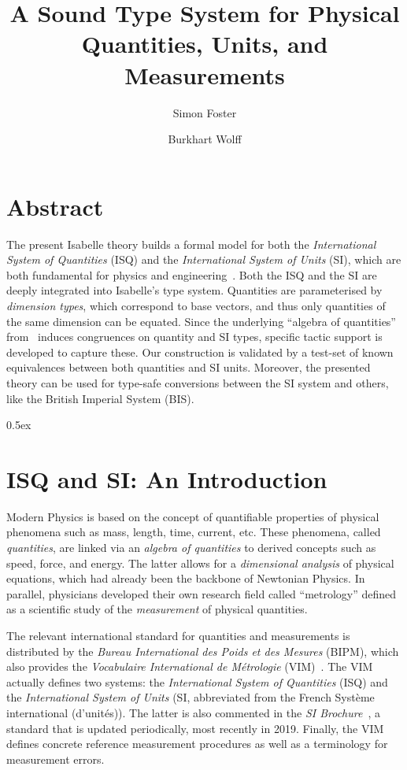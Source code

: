 \documentclass[11pt,a4paper]{book}
\begin{document}
\title{A Sound Type System for Physical \\ Quantities, Units, and Measurements}
\author{Simon Foster \and Burkhart Wolff}

\maketitle

\chapter*{Abstract}
The present Isabelle theory builds a formal model for both the \emph{International System of Quantities} (ISQ) and the
\emph{International System of Units} (SI), which are both fundamental for physics and
engineering~\cite{bipm-jcgm:2012:VIM}. Both the ISQ and the SI are deeply integrated into Isabelle's type
system. Quantities are parameterised by \emph{dimension types}, which correspond to base vectors, and thus only
quantities of the same dimension can be equated. Since the underlying ``algebra of quantities''
from~\cite{bipm-jcgm:2012:VIM} induces congruences on quantity and SI types, specific tactic support is developed
to capture these. Our construction is validated by a test-set of known equivalences between both quantities and SI
units. Moreover, the presented theory can be used for type-safe conversions between the SI system and others, like the
British Imperial System (BIS).

\tableofcontents

\parindent 0pt\parskip 0.5ex


\chapter{ISQ and SI: An Introduction}

Modern Physics is based on the concept of quantifiable properties of physical phenomena such 
as mass, length, time, current, etc. These phenomena, called \emph{quantities}, are linked via an 
\emph{algebra of quantities} to derived concepts such as speed, force, and energy. The latter 
allows for a \emph{dimensional analysis} of physical equations, which had already been the 
backbone of Newtonian Physics. In parallel, physicians developed their own research field called 
``metrology'' defined as a scientific study of the \emph{measurement} of physical quantities.

The relevant international standard for quantities and measurements is distributed by the \emph{Bureau International des
  Poids et des Mesures} (BIPM), which also provides the \emph{Vocabulaire International de M\'etrologie}
(VIM)~\cite{bipm-jcgm:2012:VIM}.  The VIM actually defines two systems: the \emph{International System of Quantities}
(ISQ) and the \emph{International System of Units} (SI, abbreviated from the French Syst\`eme international
(d’unit\'es)). The latter is also commented in the \emph{SI Brochure}~\cite{SI-Brochure}, a standard that is updated
periodically, most recently in 2019. Finally, the VIM defines concrete reference measurement procedures as well as a
terminology for measurement errors.
\end{document}
